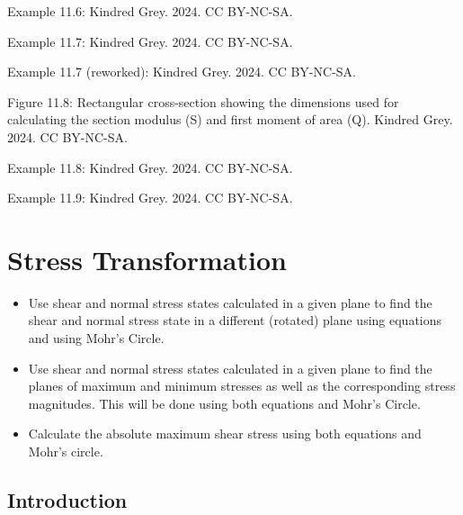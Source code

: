 \documentclass[
  letterpaper,
  DIV=11,
  numbers=noendperiod]{scrreprt}
\providecommand{\tightlist}{%
  \setlength{\itemsep}{0pt}\setlength{\parskip}{0pt}}\usepackage{longtable,booktabs,array}
\theoremstyle{definition}
\theoremstyle{remark}
\begin{document}
Example 11.6: Kindred Grey. 2024. CC BY-NC-SA.

Example 11.7: Kindred Grey. 2024. CC BY-NC-SA.

Example 11.7 (reworked): Kindred Grey. 2024. CC BY-NC-SA.

Figure 11.8: Rectangular cross-section showing the dimensions used for
calculating the section modulus (S) and first moment of area (Q).
Kindred Grey. 2024. CC BY-NC-SA.

Example 11.8: Kindred Grey. 2024. CC BY-NC-SA.

Example 11.9: Kindred Grey. 2024. CC BY-NC-SA.


\chapter{Stress Transformation}\label{sec-stress-transformation}

\begin{tcolorbox}[enhanced jigsaw, leftrule=.75mm, bottomrule=.15mm, opacityback=0, opacitybacktitle=0.6, colframe=quarto-callout-note-color-frame, toprule=.15mm, colbacktitle=quarto-callout-note-color!10!white, coltitle=black, bottomtitle=1mm, title={Learning Objectives}, titlerule=0mm, toptitle=1mm, colback=white, rightrule=.15mm, left=2mm, arc=.35mm, breakable]

\begin{itemize}
\tightlist
\item
  Use shear and normal stress states calculated in a given plane to find
  the shear and normal stress state in a different (rotated) plane using
  equations and using Mohr's Circle.
\item
  Use shear and normal stress states calculated in a given plane to find
  the planes of maximum and minimum stresses as well as the
  corresponding stress magnitudes. This will be done using both
  equations and Mohr's Circle.
\item
  Calculate the absolute maximum shear stress using both equations and
  Mohr's circle.
\end{itemize}

\end{tcolorbox}

\section*{Introduction}\label{introduction-11}
\end{document}
